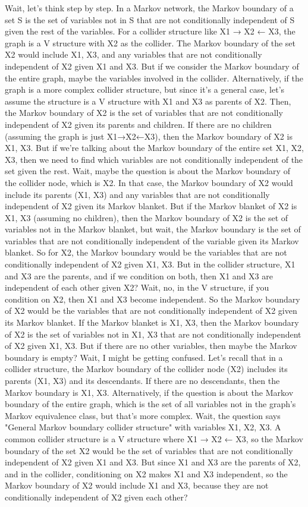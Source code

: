 Wait, let's think step by step. In a Markov network, the Markov boundary of a set S is the set of variables not in S that are not conditionally independent of S given the rest of the variables. For a collider structure like X1 → X2 ← X3, the graph is a V structure with X2 as the collider. The Markov boundary of the set {X2} would include X1, X3, and any variables that are not conditionally independent of X2 given X1 and X3. But if we consider the Markov boundary of the entire graph, maybe the variables involved in the collider. Alternatively, if the graph is a more complex collider structure, but since it's a general case, let's assume the structure is a V structure with X1 and X3 as parents of X2. Then, the Markov boundary of X2 is the set of variables that are not conditionally independent of X2 given its parents and children. If there are no children (assuming the graph is just X1→X2←X3), then the Markov boundary of X2 is {X1, X3}. But if we're talking about the Markov boundary of the entire set {X1, X2, X3}, then we need to find which variables are not conditionally independent of the set given the rest. Wait, maybe the question is about the Markov boundary of the collider node, which is X2. In that case, the Markov boundary of X2 would include its parents (X1, X3) and any variables that are not conditionally independent of X2 given its Markov blanket. But if the Markov blanket of X2 is {X1, X3} (assuming no children), then the Markov boundary of X2 is the set of variables not in the Markov blanket, but wait, the Markov boundary is the set of variables that are not conditionally independent of the variable given its Markov blanket. So for X2, the Markov boundary would be the variables that are not conditionally independent of X2 given {X1, X3}. But in the collider structure, X1 and X3 are the parents, and if we condition on both, then X1 and X3 are independent of each other given X2? Wait, no, in the V structure, if you condition on X2, then X1 and X3 become independent. So the Markov boundary of X2 would be the variables that are not conditionally independent of X2 given its Markov blanket. If the Markov blanket is {X1, X3}, then the Markov boundary of X2 is the set of variables not in {X1, X3} that are not conditionally independent of X2 given {X1, X3}. But if there are no other variables, then maybe the Markov boundary is empty? Wait, I might be getting confused. Let's recall that in a collider structure, the Markov boundary of the collider node (X2) includes its parents (X1, X3) and its descendants. If there are no descendants, then the Markov boundary is {X1, X3}. Alternatively, if the question is about the Markov boundary of the entire graph, which is the set of all variables not in the graph's Markov equivalence class, but that's more complex. Wait, the question says "General Markov boundary collider structure" with variables X1, X2, X3. A common collider structure is a V structure where X1 → X2 ← X3, so the Markov boundary of the set {X2} would be the set of variables that are not conditionally independent of X2 given X1 and X3. But since X1 and X3 are the parents of X2, and in the collider, conditioning on X2 makes X1 and X3 independent, so the Markov boundary of X2 would include X1 and X3, because they are not conditionally independent of X2 given each other? 